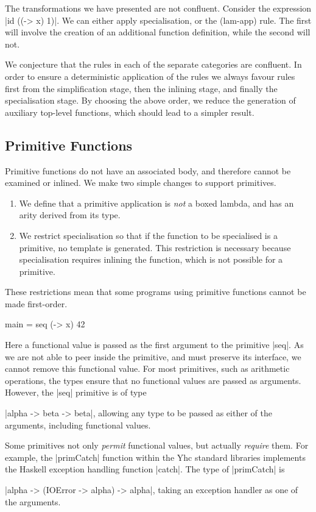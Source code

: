 \documentclass[preprint]{sigplanconf}
\begin{document}
The transformations we have presented are not confluent. Consider the expression |id ((\x -> x) 1)|. We can either apply specialisation, or the (lam-app) rule. The first will involve the creation of an additional function definition, while the second will not.

We conjecture that the rules in each of the separate categories are confluent. In order to ensure a deterministic application of the rules we always favour rules first from the simplification stage, then the inlining stage, and finally the specialisation stage. By choosing the above order, we reduce the generation of auxiliary top-level functions, which should lead to a simpler result.

\subsection{Primitive Functions}
\label{sec:primitives}

Primitive functions do not have an associated body, and therefore cannot be examined or inlined. We make two simple changes to support primitives.

\begin{enumerate}
\item We define that a primitive application is \textit{not} a boxed lambda, and has an arity derived from its type.
\item We restrict specialisation so that if the function to be specialised is a primitive, no template is generated. This restriction is necessary because specialisation requires inlining the function, which is not possible for a primitive.
\end{enumerate}

These restrictions mean that some programs using primitive functions cannot be made first-order.

\begin{example}
\begin{code}
main = seq (\x -> x) 42
\end{code}

Here a functional value is passed as the first argument to the primitive |seq|. As we are not able to peer inside the primitive, and must preserve its interface, we cannot remove this functional value. For most primitives, such as arithmetic operations, the types ensure that no functional values are passed as arguments. However, the |seq| primitive is of type \ignore|alpha -> beta -> beta|, allowing any type to be passed as either of the arguments, including functional values.

Some primitives not only \textit{permit} functional values, but actually \textit{require} them. For example, the |primCatch| function within the Yhc standard libraries implements the Haskell exception handling function |catch|. The type of |primCatch| is \ignore|alpha -> (IOError -> alpha) -> alpha|, taking an exception handler as one of the arguments.
\end{example}
\end{document}
